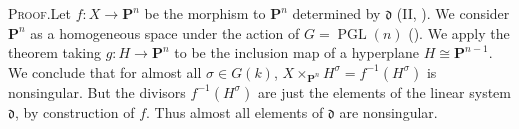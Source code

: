 {\par\smallskip\noindent\textsc{Proof.}\enspace Let $f\colon X\to\mathbf P^n$ be the morphism to $\mathbf P^n$ determined by $\mathfrak d$ (II, ). We consider $\mathbf P^n$ as a homogeneous space under the action of $G=\operatorname{PGL}(n)$ (). We apply the theorem taking $g\colon H\to\mathbf P^n$ to be the inclusion map of a hyperplane $H\cong\mathbf P^{n-1}$. We conclude that for almost all $\sigma\in G(k)$, $X\times_{\mathbf P^n}H^\sigma=f^{-1}(H^\sigma)$ is nonsingular. But the divisors $f^{-1}(H^\sigma)$ are just the elements of the linear system $\mathfrak d$, by construction of $f$. Thus almost all elements of $\mathfrak d$ are nonsingular.
}
